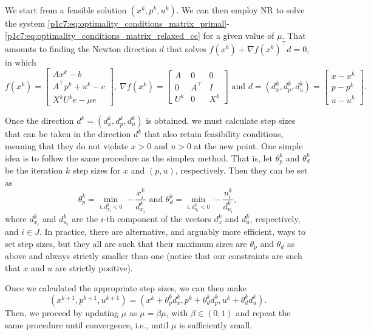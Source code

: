 We start from a feasible solution $(x^{k}, p^{k}, u^{k})$. We can then employ NR to solve the system \eqref{p1c7:eq:optimality_conditions_matrix_primal}-\eqref{p1c7:eq:optimality_conditions_matrix_relaxed_cc} for a given value of $\mu$. That amounts to finding the Newton direction $d$ that solves $f(x^k) + \nabla f(x^k)^\top d = 0$, in which
	\begin{equation*}
	f(x^k) = \begin{bmatrix}
				Ax^k - b \\
				A^\top p^k + u^k - c \\
				X^k U^k e - \mu e 
			   \end{bmatrix},	   
		\ \nabla f(x^k) = \begin{bmatrix}
					   A & 0 & 0 \\
					   0 & A^\top & I \\
					   U^k & 0 & X^k	
					  \end{bmatrix}
		 \text{ and } d = (d_x^k, d_p^k, d_u^k) = 
			\begin{bmatrix}
			x - x^k \\ 
			p - p^k \\
			u - u^k
		\end{bmatrix}.
	\end{equation*}	
	
Once the direction $d^k = (d_x^k, d_p^k, d_u^k)$ is obtained, we must calculate step sizes that can be taken in the direction $d^k$ that also retain feasibility conditions, meaning that they do not violate $x >0$ and $u > 0$ at the new point. One simple idea is to follow the same procedure as the simplex method. That is, let $\theta_p^k$ and $\theta_d^k$ be the iteration $k$ step sizes for $x$ and $(p,u)$, respectively. Then they can be set as
	\begin{equation*}
		\theta_p^k = \min_{i:d_{x_i}^k < 0} - \frac{x_i^k}{d_{x_i}^k} \text{ and }	\theta_d^k = \min_{i:d_{u_i}^k < 0} - \frac{u_i^k}{d_{u_i}^k},
	\end{equation*}
		where $d_{x_i}^k$ and $d_{u_i}^k$ are the $i$-th component of the vectors $d_x^k$ and $d_u^k$, respectively, and $i \in J$. In practice, there are alternative, and arguably more efficient, ways to set step sizes, but they all are such that their maximum sizes are $\theta_p$ and $\theta_d$ as above and always strictly smaller than one (notice that our constraints are such that $x$ and $u$ are strictly positive).
		
		Once we calculated the appropriate step sizes, we can then make 
		$$
		(x^{k+1}, p^{k+1}, u^{k+1}) = (x^{k} + \theta_{p}^kd_x^k, p^{k} + \theta_d^k d_p^{k}, u^{k} + \theta_d^k d_u^k).
	$$
	Then, we proceed by updating $\mu$ as $\mu = \beta \mu$, with $\beta \in (0,1)$ and repeat the same procedure until convergence, i.e., until $\mu$ is sufficiently small.  
		
